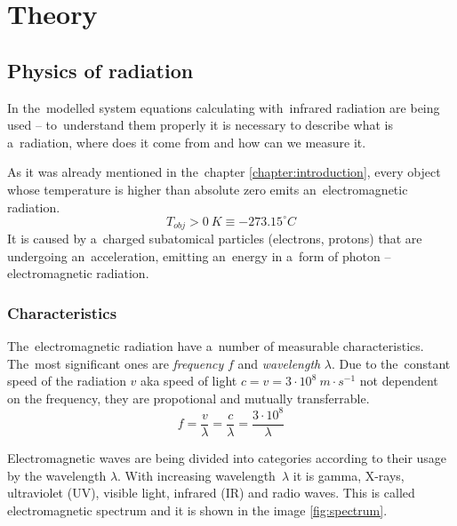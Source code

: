 






\chapter{Theory}
\label{theory}


\section{Physics of radiation}

In the~modelled system equations calculating with~infrared radiation are being used -- to~understand
them properly it is necessary to describe what is a~radiation, where does it come from and how can
we measure it. 

As it was already mentioned in the~chapter \ref{chapter:introduction}, every object whose temperature
is higher than absolute zero emits an~electromagnetic radiation.
$$T_{obj}>0~K\equiv -273.15^{\circ}C$$
It is caused by a~charged subatomical particles (electrons, protons) that are undergoing an~acceleration,
emitting an~energy in a~form of photon -- electromagnetic radiation.


\subsection*{Characteristics}
The~electromagnetic radiation have a~number of measurable characteristics. The~most significant ones
are {\it frequency} $f$ and {\it wavelength} $\lambda$. Due to the~constant speed of the radiation $v$
aka speed of light $c = v = 3\cdot10^{8}~m\cdot s^{-1}$ not dependent on the frequency, they are
propotional and mutually transferrable.
$$f=\frac{v}{\lambda}=\frac{c}{\lambda}=\frac{3\cdot10^{8}}{\lambda}$$

Electromagnetic waves are being divided into categories according to their usage by the wavelength
$\lambda$. With increasing wavelength~$\lambda$ it is gamma, X-rays, ultraviolet (UV), visible light,
infrared (IR) and radio waves. This is called electromagnetic spectrum and it is shown in the image
\ref{fig:spectrum}.

